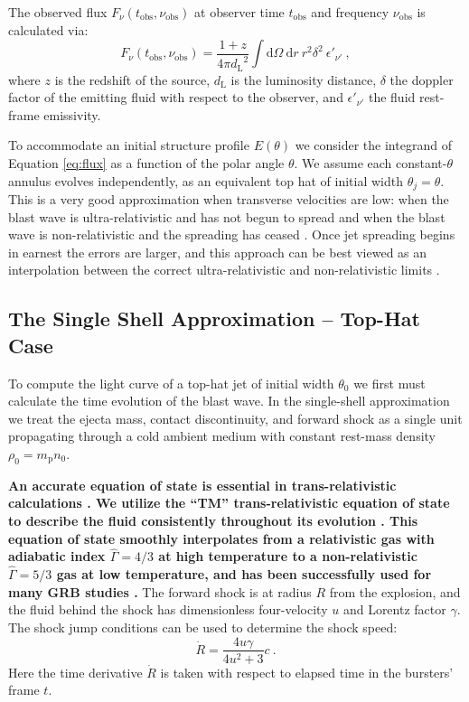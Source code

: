 \documentclass[twocolumn]{aastex62}
\newcommand{\dd}{\ensuremath{\mathrm{d}}}
\newcommand{\tobs}{\ensuremath{t_{\mathrm{obs}}}}
\newcommand{\nuobs}{\ensuremath{\nu_{\mathrm{obs}}}}
\newcommand{\dL}{\ensuremath{d_{\mathrm{L}}}}
\newcommand{\Mp}{\ensuremath{m_{\mathrm{p}}}}
\begin{document}
The observed flux $F_\nu(\tobs, \nuobs)$ at observer time $\tobs$ and frequency $\nuobs$ is calculated via:
\begin{equation}
	F_\nu(\tobs, \nuobs) = \frac{1+z}{4\pi \dL^2} \int \! \dd \Omega\  \dd r\ r^2 \delta^2\ \epsilon'_{\nu'} \ , \label{eq:flux}
\end{equation}
where $z$ is the redshift of the source, $\dL$ is the luminosity distance, $\delta$ the doppler factor of the emitting fluid with respect to the observer, and $\epsilon'_{\nu'}$ the fluid rest-frame emissivity.

To accommodate an initial structure profile $E(\theta)$ we consider the integrand of Equation \eqref{eq:flux} as a function of the polar angle $\theta$.  We assume each constant-$\theta$ annulus evolves independently, as an equivalent top hat of initial width $\theta_j = \theta$.  This is a very good approximation when transverse velocities are low: when the blast wave is ultra-relativistic and has not begun to spread and when the blast wave is non-relativistic and the spreading has ceased \citep{van-Eerten:2010aa}.  Once jet spreading begins in earnest the errors are larger, and this approach can be best viewed as an interpolation between the correct ultra-relativistic and non-relativistic limits \citep{van-Eerten:2010aa}.
{\bf 
\subsection{The Single Shell Approximation -- Top-Hat Case}\label{subsec:algo}
}
 
To compute the light curve of a top-hat jet of initial width $\theta_0$ we first must calculate the time evolution of the blast wave. In the single-shell approximation we treat the ejecta mass, contact discontinuity, and forward shock as a single unit propagating through a cold ambient medium with constant rest-mass density $\rho_0 = \Mp n_0$.  

{\bf An accurate equation of state is essential in trans-relativistic calculations \citep{Mignone:2007aa}.  We utilize the ``TM'' trans-relativistic equation of state to describe the fluid consistently throughout its evolution \citep{Mathews:1971aa, Mignone:2005aa}.  This equation of state smoothly interpolates from a relativistic gas with adiabatic index $\hat \Gamma = 4/3$ at high temperature to a non-relativistic $\hat \Gamma = 5/3$ gas at low temperature, and has been successfully used for many GRB studies \citep[e.g.][]{Uhm:2011aa, van-Eerten:2012aa}. } The forward shock is at radius $R$ from the explosion, and the fluid behind the shock has dimensionless four-velocity $u$ and Lorentz factor $\gamma$.  The shock jump conditions can be used to determine the shock speed:
\begin{equation}
	\dot{R} = \frac{4 u \gamma}{4 u^2 +3}c\ . \label{eq:Rdot}
\end{equation}
Here the time derivative $\dot{R}$ is taken with respect to elapsed time in the bursters' frame $t$.  
\end{document}
